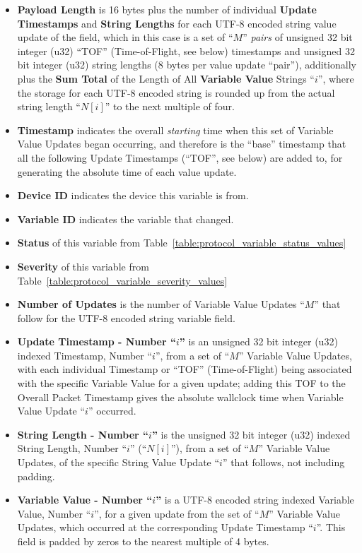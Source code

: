 \begin{itemize}
\item{\bf Payload Length} is 16 bytes plus the number
of individual {\bf Update Timestamps} and {\bf String Lengths}
for each UTF-8 encoded string value update of the field,
which in this case is a set of ``$M$'' {\it pairs} of
unsigned 32 bit integer (u32) ``TOF'' (Time-of-Flight, see below)
timestamps
and unsigned 32 bit integer (u32) string lengths
(8 bytes per value update ``pair''),
additionally plus the {\bf Sum Total} of the Length of All
{\bf Variable Value} Strings ``$i$'',
where the storage for each UTF-8 encoded string is rounded up
from the actual string length ``$N[i]$'' to the next multiple of four.
\item{\bf Timestamp} indicates the overall {\it starting} time when
this set of Variable Value Updates began occurring,
and therefore is the ``base'' timestamp that
all the following Update Timestamps (``TOF'', see below)
are added to, for generating the absolute time of each value update.
\item{\bf Device ID} indicates the device this variable is from.
\item{\bf Variable ID} indicates the variable that changed.
\item{\bf Status} of this variable from
Table~\ref{table:protocol_variable_status_values}
\item{\bf Severity} of this variable from
Table~\ref{table:protocol_variable_severity_values}
\item{\bf Number of Updates}
is the number of Variable Value Updates ``$M$''
that follow for the UTF-8 encoded string variable field.
\item{\bf Update Timestamp - Number ``$i$''} is an
unsigned 32 bit integer (u32) indexed Timestamp, Number ``$i$'',
from a set of ``$M$'' Variable Value Updates,
with each individual Timestamp or ``TOF'' (Time-of-Flight)
being associated with the specific Variable Value for a given update;
adding this TOF to the Overall Packet Timestamp gives the
absolute wallclock time when Variable Value Update ``$i$'' occurred.
\item{\bf String Length - Number ``$i$''} is the
unsigned 32 bit integer (u32) indexed String Length, Number ``$i$''
(``$N[i]$''),
from a set of ``$M$'' Variable Value Updates,
of the specific String Value Update ``$i$'' that follows,
not including padding.
\item{\bf Variable Value - Number ``$i$''} is a
UTF-8 encoded string indexed Variable Value, Number ``$i$'',
for a given update from the set of ``$M$'' Variable Value Updates,
which occurred at the corresponding Update Timestamp ``$i$''.
This field is padded by zeros to the nearest multiple of 4 bytes.
\end{itemize}


